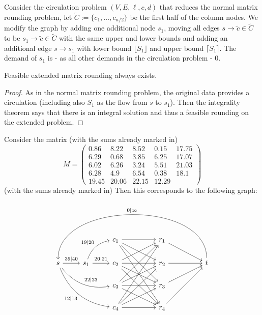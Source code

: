\documentclass{article}
\begin{document}
\begin{solving}
Consider the circulation problem $(V,E,\ell, c, d)$ that reduces the normal matrix rounding problem, let $\tilde C :=\{c_1, \dots, c_{n/2}\}$ be the first half of the column nodes. We modify the graph by adding one additional node $s_1$, moving all edges $s\to \tilde c \in \tilde C$ to be $s_1\to \tilde c\in \tilde C$ with the same upper and lower bounds and adding an additional edge $s\to s_1$ with lower bound $\lfloor S_1\rfloor$ and upper bound $\lceil S_1\rceil$. The demand of $s_1$ is - as all other demands in the circulation problem - $0$.

\begin{theorem}
    Feasible extended matrix rounding always exists.
\end{theorem}
\begin{proof}
    As in the normal matrix rounding problem, the original data provides a circulation (including also $S_1$ as the flow from $s$ to $s_1$). Then the integrality theorem says that there is an integral solution and thus a feasible rounding on the extended problem.
\end{proof}

\begin{example}
    Consider the matrix (with the sums already marked in) \begin{equation*}
        M = \left(\begin{array}{cccc|c}
             0.86& 8.22&8.52&0.15& 17.75\\
6.29&0.68&3.85&6.25& 17.07 \\
6.02&6.26&3.24&5.51& 21.03 \\
6.28&4.9&6.54&0.38 &18.1 \\\hline
19.45&20.06&22.15&12.29
        \end{array}\right)
    \end{equation*}
    (with the sums already marked in)
    Then this corresponds to the following graph:
     \begin{equation*}
          \begin{tikzcd}
        &&c_1 \arrow[rr]\arrow[rrd]\arrow[rrdd]\arrow[rrddd]&&r_1\arrow[rrd]&\\
        s\arrow[r, "39|40"] \arrow[rrd, bend right, "22|23"] \arrow[rrdd, bend right, "12|13"']&s_1 \arrow[ru, bend left, "19|20"]\arrow[r, "20|21"]&c_2\arrow[rr]\arrow[rrd]\arrow[rrdd]\arrow[rru]&&r_2\arrow[rr]&& t \arrow[llllll, bend right = 90, "0|\infty"']\\
        &&c_3\arrow[rr]\arrow[rrd]\arrow[rruu]\arrow[rru]&&r_3\arrow[rru]&\\
        &&c_4\arrow[rr]\arrow[rruuu]\arrow[rruu]\arrow[rru]&&r_4\arrow[rruu]&\\
    \end{tikzcd}
     \end{equation*}
\end{example}

\end{solving}
\newpage
\end{document}
